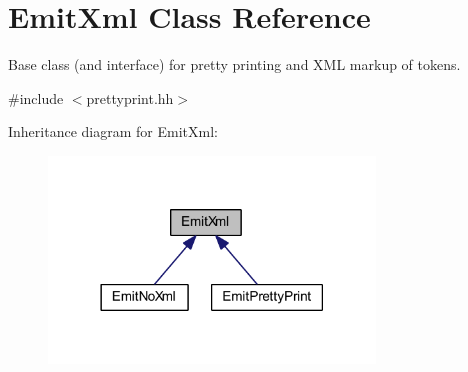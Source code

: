 \hypertarget{class_emit_xml}{}\section{Emit\+Xml Class Reference}
\label{class_emit_xml}


Base class (and interface) for pretty printing and X\+ML markup of tokens.  




{\ttfamily \#include $<$prettyprint.\+hh$>$}



Inheritance diagram for Emit\+Xml\+:
\nopagebreak
\begin{figure}[H]
\begin{center}
\leavevmode
\includegraphics[width=246pt]{class_emit_xml__inherit__graph}
\end{center}
\end{figure}
